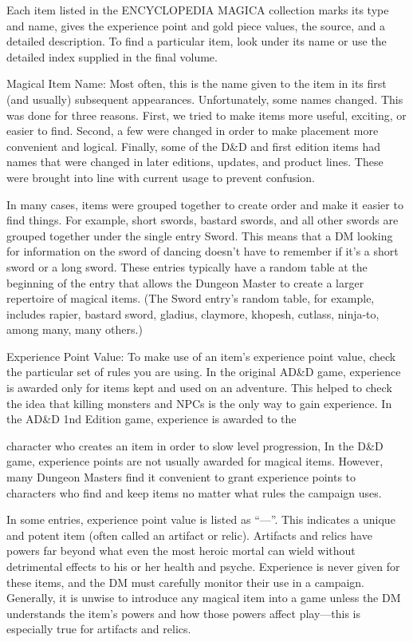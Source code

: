 Each item listed in the ENCYCLOPEDIA MAGICA collection marks its type and name, gives the experience point and gold piece values, the source, and a detailed description. To find a particular item, look under its name or use the detailed index supplied in the final volume.

Magical Item Name: Most often, this is the name given to the item in its first (and usually) subsequent appearances. Unfortunately, some names changed. This was done for three reasons. First, we tried to make items more useful, exciting, or easier to find. Second, a few were changed in order to make placement more convenient and logical. Finally, some of the D&D and first edition items had names that were changed in later editions, updates, and product lines. These were brought into line with current usage to prevent confusion.

In many cases, items were grouped together to create order and make it easier to find things. For example, short swords, bastard swords, and all other swords are grouped together under the single entry Sword. This means that a DM looking for information on the sword of dancing doesn’t have to remember if it’s a short sword or a long sword. These entries typically have a random table at the beginning of the entry that allows the Dungeon Master to create a larger repertoire of magical items. (The Sword entry’s random table, for example, includes rapier, bastard sword, gladius, claymore, khopesh, cutlass, ninja-to, among many, many others.)

Experience Point Value: To make use of an item’s experience point value, check the particular set of rules you are using. In the original AD&D game, experience is awarded only for items kept and used on an adventure. This helped to check the idea that killing monsters and NPCs is the only way to gain experience. In the AD&D 1nd Edition game, experience is awarded to the

character who creates an item in order to slow level progression, In the D&D game, experience points are not usually awarded for magical items. However, many Dungeon Masters find it convenient to grant experience points to characters who find and keep items no matter what rules the campaign uses.

In some entries, experience point value is listed as “—”. This indicates a unique and potent item (often called an artifact or relic). Artifacts and relics have powers far beyond what even the most heroic mortal can wield without detrimental effects to his or her health and psyche. Experience is never given for these items, and the DM must carefully monitor their use in a campaign. Generally, it is unwise to introduce any magical item into a game unless the DM understands the item’s powers and how those powers affect play—this is especially true for artifacts and relics.

